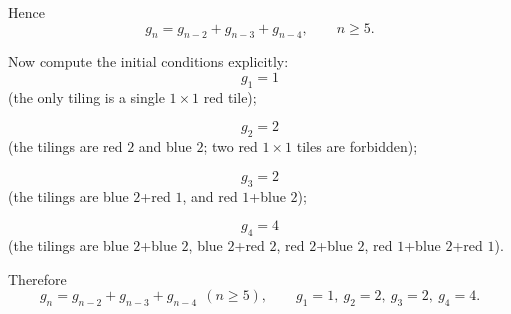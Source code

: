 \documentclass[12pt]{article}
\begin{document}
\begin{enumerate}[label=(\alph*)]
Hence
\[
g_n=g_{n-2}+g_{n-3}+g_{n-4}, \qquad n\ge 5.
\]

Now compute the initial conditions explicitly:
\[
g_1=1
\]
(the only tiling is a single \(1\times 1\) red tile);

\[
g_2=2
\]
(the tilings are red \(2\) and blue \(2\); two red \(1\times 1\) tiles are forbidden);

\[
g_3=2
\]
(the tilings are blue \(2\)+red \(1\), and red \(1\)+blue \(2\));

\[
g_4=4
\]
(the tilings are blue \(2\)+blue \(2\), blue \(2\)+red \(2\), red \(2\)+blue \(2\), red \(1\)+blue \(2\)+red \(1\)).

Therefore
\[
\boxed{g_n=g_{n-2}+g_{n-3}+g_{n-4}\ \ (n\ge 5), \qquad g_1=1,\ g_2=2,\ g_3=2,\ g_4=4.}
\]
\end{enumerate}

\newpage
\end{document}
